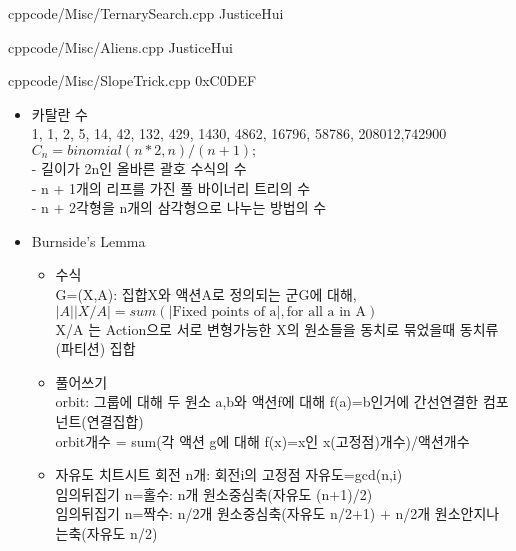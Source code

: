 \documentclass[landscape, 8pt, a4paper, oneside, twocolumn]{extarticle}
\begin{document}
{}{}
{cpp}{code/Misc/TernarySearch.cpp}
{JusticeHui}

{}{}
{cpp}{code/Misc/Aliens.cpp}
{JusticeHui}

{}{}
{cpp}{code/Misc/SlopeTrick.cpp}
{0xC0DEF}

%

%

%

{}{}{}{}{}
\begin{itemize}
\setlength\itemsep{0.1em}
    
\item 카탈란 수\\
1, 1, 2, 5, 14, 42, 132, 429, 1430, 4862, 16796, 58786, 208012,742900\\
$C_n = binomial(n * 2, n) / (n + 1);$\\
- 길이가 2n인 올바른 괄호 수식의 수\\
- n + 1개의 리프를 가진 풀 바이너리 트리의 수\\
- n + 2각형을 n개의 삼각형으로 나누는 방법의 수

\item Burnside’s Lemma
\begin{itemize}
    \item 수식\\
    G=(X,A): 집합X와 액션A로 정의되는 군G에 대해, $\vert A\vert\vert X/A \vert=sum(\vert \text{Fixed points of a}\vert,\text{for all a in A})$\\
    X/A 는 Action으로 서로 변형가능한 X의 원소들을 동치로 묶었을때 동치류(파티션) 집합
    \item 풀어쓰기\\
    orbit: 그룹에 대해 두 원소 a,b와 액션f에 대해 f(a)=b인거에 간선연결한 컴포넌트(연결집합)\\
    orbit개수 = sum(각 액션 g에 대해 f(x)=x인 x(고정점)개수)/액션개수
    \item 자유도 치트시트
    회전 n개: 회전i의 고정점 자유도=gcd(n,i)\\
    임의뒤집기 n=홀수: n개 원소중심축(자유도 (n+1)/2)\\
    임의뒤집기 n=짝수: n/2개 원소중심축(자유도 n/2+1) + n/2개 원소안지나는축(자유도 n/2)
\end{itemize}


\end{itemize}
\end{document}
